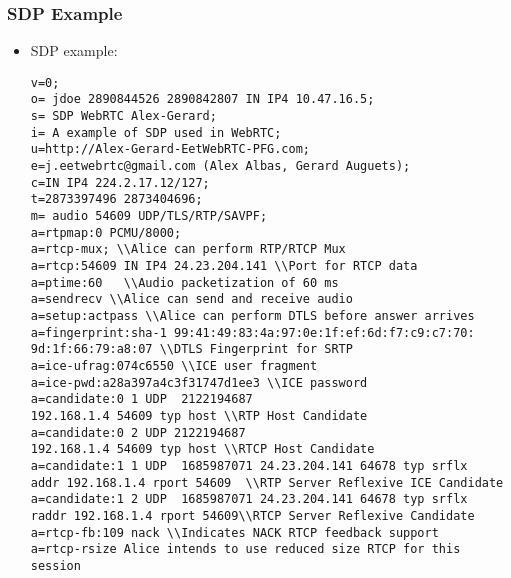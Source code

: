 \begin{frame}[fragile]\frametitle{SDP Example}
\begin{itemize}
\item SDP example:

\begin{lstlisting}[style=verbt]
v=0;
o= jdoe 2890844526 2890842807 IN IP4 10.47.16.5;
s= SDP WebRTC Alex-Gerard;
i= A example of SDP used in WebRTC;
u=http://Alex-Gerard-EetWebRTC-PFG.com;
e=j.eetwebrtc@gmail.com (Alex Albas, Gerard Auguets);
c=IN IP4 224.2.17.12/127;
t=2873397496 2873404696;
m= audio 54609 UDP/TLS/RTP/SAVPF;
a=rtpmap:0 PCMU/8000;
a=rtcp-mux; \\Alice can perform RTP/RTCP Mux
a=rtcp:54609 IN IP4 24.23.204.141 \\Port for RTCP data
a=ptime:60   \\Audio packetization of 60 ms
a=sendrecv \\Alice can send and receive audio
a=setup:actpass \\Alice can perform DTLS before answer arrives
a=fingerprint:sha-1 99:41:49:83:4a:97:0e:1f:ef:6d:f7:c9:c7:70:
9d:1f:66:79:a8:07 \\DTLS Fingerprint for SRTP
a=ice-ufrag:074c6550 \\ICE user fragment 
a=ice-pwd:a28a397a4c3f31747d1ee3 \\ICE password       
a=candidate:0 1 UDP  2122194687 
192.168.1.4 54609 typ host \\RTP Host Candidate
a=candidate:0 2 UDP 2122194687        
192.168.1.4 54609 typ host \\RTCP Host Candidate    
a=candidate:1 1 UDP  1685987071 24.23.204.141 64678 typ srflx        
addr 192.168.1.4 rport 54609  \\RTP Server Reflexive ICE Candidate 
a=candidate:1 2 UDP  1685987071 24.23.204.141 64678 typ srflx 
raddr 192.168.1.4 rport 54609\\RTCP Server Reflexive Candidate
a=rtcp-fb:109 nack \\Indicates NACK RTCP feedback support
a=rtcp-rsize Alice intends to use reduced size RTCP for this session   
\end{lstlisting}
  

\end{itemize}
\end{frame}




